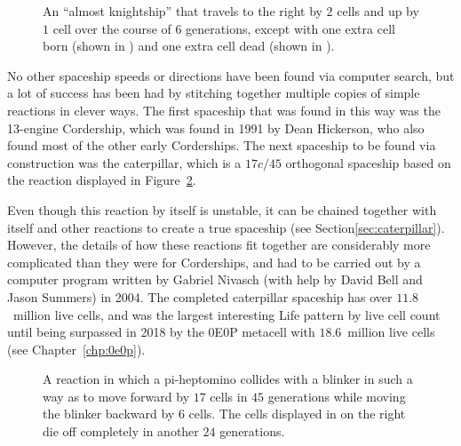 \begin{figure}[!htb]
	\centering
	\caption{An ``almost knightship'' that travels to the right by $2$ cells and up by $1$ cell over the course of $6$ generations, except with one extra cell born (shown in ) and one extra cell dead (shown in ).}\label{fig:almost_knightship}
\end{figure}

No other spaceship speeds or directions have been found via computer search, but a lot of success has been had by stitching together multiple copies of simple reactions in clever ways. The first spaceship that was found in this way was the 13-engine Cordership, which was found in 1991 by Dean Hickerson, who also found most of the other early Corderships. The next spaceship to be found via construction was the caterpillar, which is a $17c/45$ orthogonal spaceship based on the reaction displayed in Figure~\ref{fig:17c45_reaction}.

Even though this reaction by itself is unstable, it can be chained together with itself and other reactions to create a true spaceship (see Section\ref{sec:caterpillar}). However, the details of how these reactions fit together are considerably more complicated than they were for Corderships, and had to be carried out by a computer program written by Gabriel Nivasch (with help by David Bell and Jason Summers) in 2004. The completed caterpillar spaceship has over $11.8$~million live cells, and was the largest interesting Life pattern by live cell count until being surpassed in 2018 by the 0E0P  metacell with $18.6$~million live cells (see Chapter~\ref{chp:0e0p}).

\begin{figure}[!htb]
	\centering
	\caption{A reaction in which a pi-heptomino collides with a blinker in such a way as to move forward by $17$ cells in $45$ generations while moving the blinker backward by $6$ cells. The cells displayed in  on the right die off completely in another $24$ generations.}\label{fig:17c45_reaction}
\end{figure}

